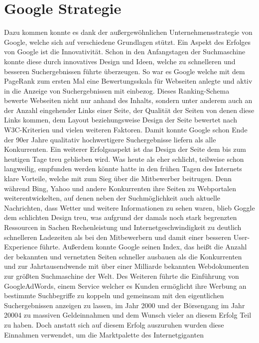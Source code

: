 \section{Google Strategie}\label{sec:google-strategie}
Dazu kommen konnte es dank der außergewöhnlichen Unternehmensstrategie von Google, welche sich auf verschiedene Grundlagen
stützt.
Ein Aspekt des Erfolges von Google ist die Innovativität.
Schon in den Anfangstagen der Suchmaschine konnte diese durch innovatives Design und Ideen, welche zu schnelleren und
besseren Suchergebnissen führte überzeugen.
So war es Google welche mit dem PageRank zum ersten Mal eine Bewertungsskala für Webseiten anlegte und aktiv in die
Anzeige von Suchergebnissen mit einbezog.
Dieses Ranking-Schema bewerte Webseiten nicht nur anhand des Inhalts, sondern unter anderem auch an der Anzahl
eingehender Links einer Seite, der Qualität der Seiten von denen diese Links kommen, dem Layout beziehungsweise Design
der Seite bewertet nach W3C-Kriterien und vielen weiteren Faktoren.
Damit konnte Google schon Ende der 90er Jahre qualitativ hochwertigere Suchergebnisse liefern als alle Konkurrenten.
Ein weiterer Erfolgsaspekt ist das Design der Seite dem bis zum heutigen Tage treu geblieben wird.
Was heute als eher schlicht, teilweise schon langweilig, empfunden werden könnte hatte in den frühen Tagen des Internets
klare Vorteile, welche mit zum Sieg über die Mitbewerber beitrugen.
Denn während Bing, Yahoo und andere Konkurrenten ihre Seiten zu Webportalen weiterentwickelten, auf denen neben der
Suchmöglichkeit auch aktuelle Nachrichten, dass Wetter und weitere Informationen zu sehen waren, blieb Goggle dem schlichten
Design treu, was aufgrund der damals noch stark begrenzten Ressourcen in Sachen Rechenleistung und Internetgeschwindigkeit
zu deutlich schnelleren Ladezeiten als bei den Mitbewerbern und damit einer besseren User-Experience führte.
Außerdem konnte Google seinen Index, das heißt die Anzahl der bekannten und vernetzten Seiten schneller ausbauen als die
Konkurrenten und zur Jahrtausendwende mit über einer Milliarde bekannten Webdokumenten zur größten Suchmaschine der Welt.
Des Weiteren führte die Einführung von GoogleAdWords, einem Service welcher es Kunden ermöglicht ihre Werbung an
bestimmte Suchbegriffe zu koppeln und gemeinsam mit den eigentlichen Suchergebnissen anzeigen zu lassen, im Jahr 2000 und
der Börsengang im Jahr 20004 zu massiven Geldeinnahmen und dem Wunsch vieler an diesem Erfolg Teil zu haben.
Doch anstatt sich auf diesem Erfolg auszuruhen wurden diese Einnahmen verwendet, um die Marktpalette des Internetgiganten
